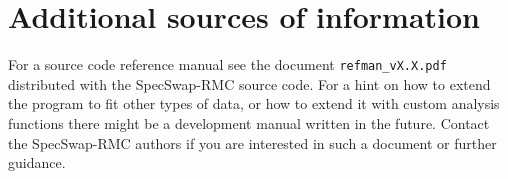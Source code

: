 \documentclass[a4paper, 10pt]{article}
\begin{document}
\section{Additional sources of information}
For a source code reference manual see the document
{\tt refman\_vX.X.pdf} distributed with the SpecSwap-RMC source code.
For a hint on how to extend the program to fit other types of data,
or how to extend it with custom analysis functions there might be a
development manual written in the future. Contact the SpecSwap-RMC
authors if you are interested in such a document or further guidance.

\newpage

\end{document}
